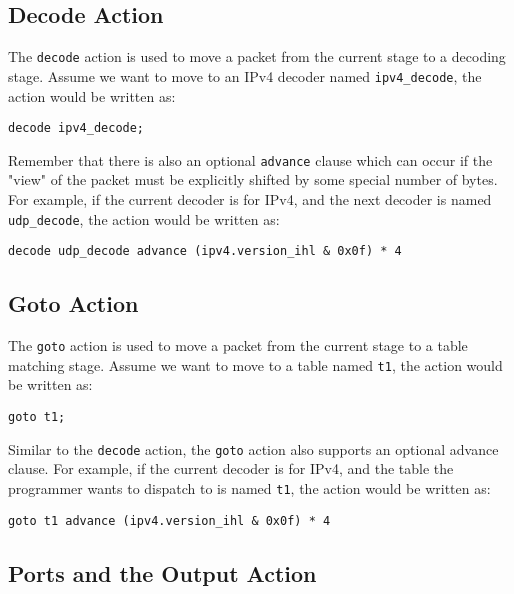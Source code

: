 \subsection{Decode Action} \label{decode_action_tut}

The \texttt{decode} action is used to move a packet from the current stage to a decoding stage. Assume we want to move to an IPv4 decoder named \texttt{ipv4\_decode}, the action would be written as:

\begin{lstlisting}
decode ipv4_decode;
\end{lstlisting}

Remember that there is also an optional \texttt{advance} clause which can occur if the "view" of the packet must be explicitly shifted by some special number of bytes. For example, if the current decoder is for IPv4, and the next decoder is named \texttt{udp\_decode}, the action would be written as:

\begin{lstlisting}
decode udp_decode advance (ipv4.version_ihl & 0x0f) * 4
\end{lstlisting}

\subsection{Goto Action} \label{goto_action_tut}

The \texttt{goto} action is used to move a packet from the current stage to a table matching stage. Assume we want to move to a table named \texttt{t1}, the action would be written as:

\begin{lstlisting}
goto t1;
\end{lstlisting}

Similar to the \texttt{decode} action, the \texttt{goto} action also supports an optional advance clause. For example, if the current decoder is for IPv4, and the table the programmer wants to dispatch to is named \texttt{t1}, the action would be written as:

\begin{lstlisting}
goto t1 advance (ipv4.version_ihl & 0x0f) * 4
\end{lstlisting}

\subsection{Ports and the Output Action} \label{output_action_tut}

